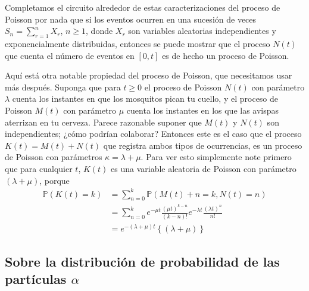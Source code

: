 	Completamos el circuito alrededor de estas caracterizaciones del proceso de Poisson por nada que si los eventos ocurren en una sucesión de veces $S_{n}=\sum_{r=1}^{n}X_{r}$, $n\ge1$, donde $X_{r}$ son variables aleatorias independientes y exponencialmente distribuidas, entonces se puede mostrar que el proceso $N\left(t\right)$ que cuenta el número de eventos en $\left[0,t\right]$ es de hecho un proceso de Poisson.

	Aquí está otra notable propiedad del proceso de Poisson, que necesitamos usar más después. Suponga que para $t\ge0$ el proceso de Poisson $N\left(t\right)$ con parámetro $\lambda$ cuenta los instantes en que los mosquitos pican tu cuello, y el proceso de Poisson $M\left(t\right)$ con parámetro $\mu$ cuenta los instantes en los que las avispas aterrizan en tu cerveza. Parece razonable suponer que $M\left(t\right)$ y $N\left(t\right)$ son independientes; ¿cómo podrían colaborar? Entonces este es el caso que el proceso $K\left(t\right)=M\left(t\right)+N\left(t\right)$ que registra ambos tipos de ocurrencias, es un proceso de Poisson con parámetros $\kappa=\lambda+\mu$. Para ver esto simplemente note primero que para cualquier $t$, $K\left(t\right)$ es una variable aleatoria de Poisson con parámetro $\left(\lambda+\mu\right)$, porque
	\begin{align*}
		\mathds{P}\left(K\left(t\right)=k\right)
		&=\sum_{n=0}^{k}\mathds{P}\left(M\left(t\right)+n=k, N\left(t\right)=n\right)\\
		&=\sum_{n=0}^{k}e^{-\mu t}\frac{{\left(\mu t\right)^{k-n}}}{\left(k-n\right)!}e^{-\lambda t}\frac{{\left(\lambda t\right)}^{n}}{n!}\\
		&=e^{-\left(\lambda+\mu\right)t}\left\{\left(\lambda+\mu\right)\right\}
	\end{align*}

	\subsection{Sobre la distribución de probabilidad de las partículas $\alpha$}\label{sec:note}

